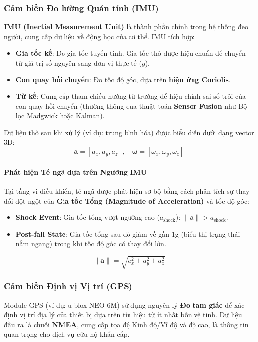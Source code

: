 \subsubsection{Cảm biến Đo lường Quán tính (IMU)}
\textbf{IMU (Inertial Measurement Unit)} là thành phần chính trong hệ thống đeo người, cung cấp dữ liệu về động học của cơ thể. IMU tích hợp:
\begin{itemize}
    \item \textbf{Gia tốc kế}: Đo gia tốc tuyến tính. Gia tốc thô được hiệu chuẩn để chuyển từ giá trị số nguyên sang đơn vị thực tế ($g$).
    \item \textbf{Con quay hồi chuyển}: Đo tốc độ góc, dựa trên \textbf{hiệu ứng Coriolis}.
    \item \textbf{Từ kế}: Cung cấp tham chiếu hướng từ trường để hiệu chỉnh sai số trôi của con quay hồi chuyển (thường thông qua thuật toán \textbf{Sensor Fusion} như Bộ lọc Madgwick hoặc Kalman).
\end{itemize}

Dữ liệu thô sau khi xử lý (ví dụ: trung bình hóa) được biểu diễn dưới dạng vector 3D:
\[
\mathbf{a} = [a_x, a_y, a_z], \quad
\boldsymbol{\omega} = [\omega_x, \omega_y, \omega_z]
\]

\paragraph{Phát hiện Té ngã dựa trên Ngưỡng IMU}
Tại tầng vi điều khiển, té ngã được phát hiện sơ bộ bằng cách phân tích sự thay đổi đột ngột của \textbf{Gia tốc Tổng (Magnitude of Acceleration)} và tốc độ góc:
\begin{itemize}
    \item \textbf{Shock Event}: Gia tốc tổng vượt ngưỡng cao ($a_{\text{shock}}$): $\|\mathbf{a}\| > a_{\text{shock}}$.
    \item \textbf{Post-fall State}: Gia tốc tổng sau đó giảm về gần 1g (biểu thị trạng thái nằm ngang) trong khi tốc độ góc có thay đổi lớn.
\end{itemize}
\[
\|\mathbf{a}\| = \sqrt{a_x^2 + a_y^2 + a_z^2}
\]

\subsubsection{Cảm biến Định vị Vị trí (GPS)}
Module GPS (ví dụ: u-blox NEO-6M) sử dụng nguyên lý \textbf{Đo tam giác} để xác định vị trí địa lý của thiết bị dựa trên tín hiệu từ ít nhất bốn vệ tinh. Dữ liệu đầu ra là chuỗi \textbf{NMEA}, cung cấp tọa độ Kinh độ/Vĩ độ và độ cao, là thông tin quan trọng cho dịch vụ cứu hộ khẩn cấp.

